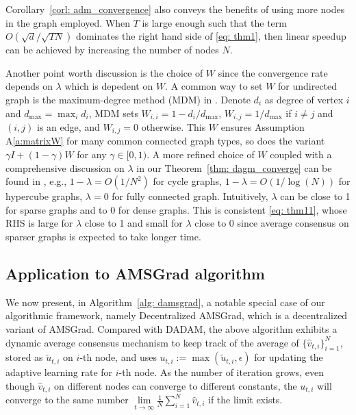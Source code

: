 \documentclass[11pt]{article}
\begin{document}
 Corollary~\ref{corl:  adm_convergence} also conveys the benefits of using more nodes in the graph employed. 
When $T$ is large enough such that the term $O(\sqrt{d}/\sqrt{TN})$ dominates the right hand side of \eqref{eq: thm1}, then linear speedup can be achieved by increasing the number of nodes $N$.   

Another point worth discussion is the choice of $W$ since the convergence rate depends on $\lambda$ which is depedent on $W$. A common way to set $W$ for undirected graph is the maximum-degree method (MDM) in \cite{boyd2004fastest}. Denote $d_i$ as degree of vertex $i$ and $d_{\max} = \max_i d_i$, MDM sets $W_{i,i} = 1-d_i/d_{\max}$, $W_{i,j} = 1/d_{\max}$ if $i\neq j$ and $(i,j)$ is an edge,  and $W_{i,j} = 0$ otherwise. This $W$ ensures Assumption A\ref{a:matrixW} for many common connected graph types, so does the variant $\gamma I + (1-\gamma) W$ for any $\gamma \in [0,1)$.  
A more refined choice of $W$ coupled with a comprehensive discussion on $\lambda$ in our Theorem~\ref{thm: dagm_converge} can be found in \cite{boyd2009fastest}, e.g., $1-\lambda =O(1/N^2)$ for cycle graphs, $1-\lambda =O(1/\log(N))$ for hypercube graphs, $\lambda = 0$ for fully connected graph. 
Intuitively, $\lambda$ can be close to 1 for sparse graphs and to 0 for dense graphs.
This is consistent \eqref{eq: thm11}, whose RHS is large for $\lambda$ close to 1 and small for $\lambda $ close to 0 since average consensus on sparser graphs is expected to take longer time.

\subsection{Application to AMSGrad algorithm}\label{sec:amsgrad}


We now present, in Algorithm~\ref{alg: damsgrad}, a notable special case of our algorithmic framework, namely Decentralized AMSGrad, which is a decentralized variant of AMSGrad.
Compared with DADAM, the above algorithm exhibits a dynamic average consensus mechanism to keep track of the average of $\{\hat v_{t,i}\}_{i=1}^N$, stored as $\tilde u_{t,i}$ on $i$-th node, and uses $u_{t,i} := \max(\tilde u_{t,i}, \epsilon)$ for updating the adaptive learning rate for $i$-th node. 
As the number of iteration grows, even though $\hat v_{t,i}$ on different nodes can converge to different constants, the $u_{t,i}$ will converge to the same number $ \lim \limits_{t \rightarrow \infty} \frac{1}{N} \sum_{i=1}^N\hat v_{t,i} $ if the limit exists. 
\end{document}
